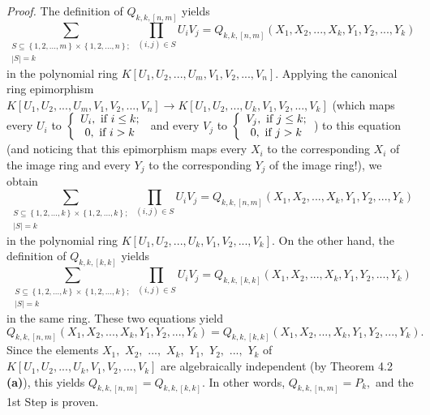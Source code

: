 \documentclass[12pt,final,notitlepage,onecolumn,german]{article}%
\begin{document}
\textit{Proof.} The definition of $Q_{k,k,\left[  n,m\right]  }$ yields
\[
\sum_{\substack{S\subseteq\left\{  1,2,...,m\right\}  \times\left\{
1,2,...,n\right\}  ;\\\left\vert S\right\vert =k}}\prod_{\left(  i,j\right)
\in S}U_{i}V_{j}=Q_{k,k,\left[  n,m\right]  }\left(  X_{1},X_{2}%
,...,X_{k},Y_{1},Y_{2},...,Y_{k}\right)
\]
in the polynomial ring $K\left[  U_{1},U_{2},...,U_{m},V_{1},V_{2}%
,...,V_{n}\right]  $. Applying the canonical ring epimorphism $K\left[
U_{1},U_{2},...,U_{m},V_{1},V_{2},...,V_{n}\right]  \rightarrow K\left[
U_{1},U_{2},...,U_{k},V_{1},V_{2},...,V_{k}\right]  $ (which maps every
$U_{i}$ to $\left\{
\begin{array}
[c]{c}%
U_{i},\text{ if }i\leq k;\\
0,\text{ if }i>k
\end{array}
\right.  $ and every $V_{j}$ to $\left\{
\begin{array}
[c]{c}%
V_{j},\text{ if }j\leq k;\\
0,\text{ if }j>k
\end{array}
\right.  $) to this equation (and noticing that this epimorphism maps every
$X_{i}$ to the corresponding $X_{i}$ of the image ring and every $Y_{j}$ to
the corresponding $Y_{j}$ of the image ring!), we obtain%
\[
\sum_{\substack{S\subseteq\left\{  1,2,...,k\right\}  \times\left\{
1,2,...,k\right\}  ;\\\left\vert S\right\vert =k}}\prod_{\left(  i,j\right)
\in S}U_{i}V_{j}=Q_{k,k,\left[  n,m\right]  }\left(  X_{1},X_{2}%
,...,X_{k},Y_{1},Y_{2},...,Y_{k}\right)
\]
in the polynomial ring $K\left[  U_{1},U_{2},...,U_{k},V_{1},V_{2}%
,...,V_{k}\right]  $. On the other hand, the definition of $Q_{k,k,\left[
k,k\right]  }$ yields%
\[
\sum_{\substack{S\subseteq\left\{  1,2,...,k\right\}  \times\left\{
1,2,...,k\right\}  ;\\\left\vert S\right\vert =k}}\prod_{\left(  i,j\right)
\in S}U_{i}V_{j}=Q_{k,k,\left[  k,k\right]  }\left(  X_{1},X_{2}%
,...,X_{k},Y_{1},Y_{2},...,Y_{k}\right)
\]
in the same ring. These two equations yield%
\[
Q_{k,k,\left[  n,m\right]  }\left(  X_{1},X_{2},...,X_{k},Y_{1},Y_{2}%
,...,Y_{k}\right)  =Q_{k,k,\left[  k,k\right]  }\left(  X_{1},X_{2}%
,...,X_{k},Y_{1},Y_{2},...,Y_{k}\right)  .
\]
Since the elements $X_{1},$ $X_{2},$ $...,$ $X_{k},$ $Y_{1},$ $Y_{2},$ $...,$
$Y_{k}$ of $K\left[  U_{1},U_{2},...,U_{k},V_{1},V_{2},...,V_{k}\right]  $ are
algebraically independent (by Theorem 4.2 \textbf{(a)}), this yields
$Q_{k,k,\left[  n,m\right]  }=Q_{k,k,\left[  k,k\right]  }.$ In other words,
$Q_{k,k,\left[  n,m\right]  }=P_{k},$ and the 1st Step is proven.
\end{document}
